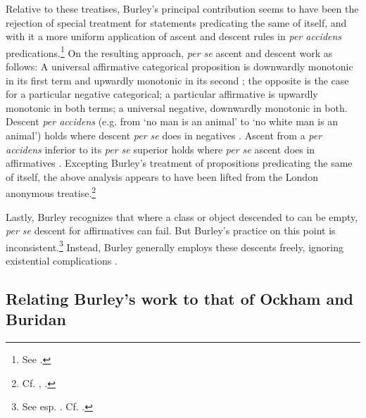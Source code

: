 	Relative to these treatises, Burley's principal contribution seems to have been the rejection of special treatment for statements predicating the same of itself, and with it a more uniform application of ascent and descent rules in \textit{per accidens} predications.\footnote{See \cite[pp. 116-117, par. 19-20; 134, par. 95; p. 158, par. 160.]{Green-Pedersen1980b}.} On the resulting approach, \textit{per se} ascent and descent work as follows: A universal affirmative categorical proposition is downwardly monotonic in its first term and upwardly monotonic in its second \autocite[p. 211.16-20]{BurleyDPAL}; the opposite is the case for a particular negative categorical; a particular affirmative is upwardly monotonic in both terms; a universal negative, downwardly monotonic in both. Descent \textit{per accidens} (e.g. from `no man is an animal' to `no white man is an animal') holds where descent \textit{per se} does in negatives \autocite[pp. 209.35-210.10]{BurleyDPAL}. Ascent from a \textit{per accidens} inferior to its \textit{per se} superior holds where \textit{per se} ascent does in affirmatives \autocite[pp. 116-117, par. 20]{Green-Pedersen1980b}. Excepting Burley's treatment of propositions predicating the same of itself, the above analysis appears to have been lifted from the London anonymous treatise.\footnote{Cf. \cite[pp. 10-11, par. 35-37]{Green-Pedersen1980a}, \cite[pp. 116-117, par. 19-20]{Green-Pedersen1980b}.} 
	
	Lastly, Burley recognizes that where a class or object descended to can be empty, \textit{per se} descent for affirmatives can fail. But Burley's practice on this point is inconsistent.\footnote{See esp. \cite[pp. 61.4, 85.16; 85.4, 211.27-28]{BurleyDPAL}. Cf. \cite{Mora-Marquez2015}.} Instead, Burley generally employs these descents freely, ignoring existential complications \autocite[pp. 23.26, 26.26, 31.21, 67.19, 67.30, 85.16, 85.26, 211.27-28]{BurleyDPAL}.
	
	
	
	\subsection{Relating Burley's work to that of Ockham and Buridan}
